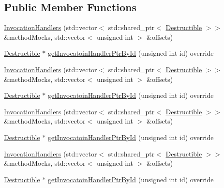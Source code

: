 \subsection*{Public Member Functions}
\begin{DoxyCompactItemize}
\item 
\mbox{\hyperlink{classfakeit_1_1InvocationHandlers_a2fd61aecd4f313aa0ca83b2ab438eeef}{Invocation\+Handlers}} (std\+::vector$<$ std\+::shared\+\_\+ptr$<$ \mbox{\hyperlink{classfakeit_1_1Destructible}{Destructible}} $>$$>$ \&method\+Mocks, std\+::vector$<$ unsigned int $>$ \&offsets)
\item 
\mbox{\hyperlink{classfakeit_1_1Destructible}{Destructible}} $\ast$ \mbox{\hyperlink{classfakeit_1_1InvocationHandlers_a47af368f009fc5e3cce950ebbab4c48d}{get\+Invocatoin\+Handler\+Ptr\+By\+Id}} (unsigned int id) override
\item 
\mbox{\hyperlink{classfakeit_1_1InvocationHandlers_a2fd61aecd4f313aa0ca83b2ab438eeef}{Invocation\+Handlers}} (std\+::vector$<$ std\+::shared\+\_\+ptr$<$ \mbox{\hyperlink{classfakeit_1_1Destructible}{Destructible}} $>$$>$ \&method\+Mocks, std\+::vector$<$ unsigned int $>$ \&offsets)
\item 
\mbox{\hyperlink{classfakeit_1_1Destructible}{Destructible}} $\ast$ \mbox{\hyperlink{classfakeit_1_1InvocationHandlers_a47af368f009fc5e3cce950ebbab4c48d}{get\+Invocatoin\+Handler\+Ptr\+By\+Id}} (unsigned int id) override
\item 
\mbox{\hyperlink{classfakeit_1_1InvocationHandlers_a2fd61aecd4f313aa0ca83b2ab438eeef}{Invocation\+Handlers}} (std\+::vector$<$ std\+::shared\+\_\+ptr$<$ \mbox{\hyperlink{classfakeit_1_1Destructible}{Destructible}} $>$$>$ \&method\+Mocks, std\+::vector$<$ unsigned int $>$ \&offsets)
\item 
\mbox{\hyperlink{classfakeit_1_1Destructible}{Destructible}} $\ast$ \mbox{\hyperlink{classfakeit_1_1InvocationHandlers_a47af368f009fc5e3cce950ebbab4c48d}{get\+Invocatoin\+Handler\+Ptr\+By\+Id}} (unsigned int id) override
\item 
\mbox{\hyperlink{classfakeit_1_1InvocationHandlers_a2fd61aecd4f313aa0ca83b2ab438eeef}{Invocation\+Handlers}} (std\+::vector$<$ std\+::shared\+\_\+ptr$<$ \mbox{\hyperlink{classfakeit_1_1Destructible}{Destructible}} $>$$>$ \&method\+Mocks, std\+::vector$<$ unsigned int $>$ \&offsets)
\item 
\mbox{\hyperlink{classfakeit_1_1Destructible}{Destructible}} $\ast$ \mbox{\hyperlink{classfakeit_1_1InvocationHandlers_a47af368f009fc5e3cce950ebbab4c48d}{get\+Invocatoin\+Handler\+Ptr\+By\+Id}} (unsigned int id) override

\end{DoxyCompactItemize}
